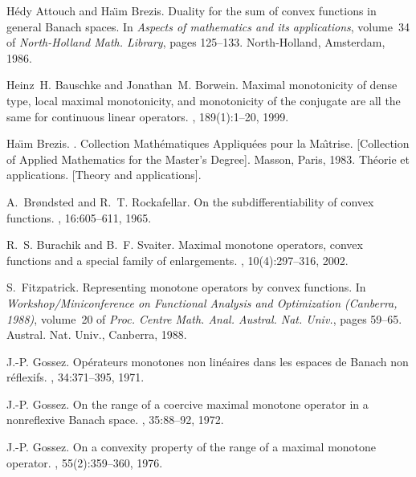 \documentclass[11pt]{article}
\begin{document}
\begin{thebibliography}{10}

H{\'e}dy Attouch and Ha{\"{\i}}m Brezis.
\newblock Duality for the sum of convex functions in general {B}anach spaces.
\newblock In {\em Aspects of mathematics and its applications}, volume~34 of
  {\em North-Holland Math. Library}, pages 125--133. North-Holland, Amsterdam,
  1986.

Heinz~H. Bauschke and Jonathan~M. Borwein.
\newblock Maximal monotonicity of dense type, local maximal monotonicity, and
  monotonicity of the conjugate are all the same for continuous linear
  operators.
, 189(1):1--20, 1999.

Ha{\"{\i}}m Brezis.
.
\newblock Collection Math\'ematiques Appliqu\'ees pour la Ma\^\i trise.
  [Collection of Applied Mathematics for the Master's Degree]. Masson, Paris,
  1983.
\newblock Th{\'e}orie et applications. [Theory and applications].

A.~Br{\o}ndsted and R.~T. Rockafellar.
\newblock On the subdifferentiability of convex functions.
, 16:605--611, 1965.

R.~S. Burachik and B.~F. Svaiter.
\newblock Maximal monotone operators, convex functions and a special family of
  enlargements.
, 10(4):297--316, 2002.

S.~Fitzpatrick.
\newblock Representing monotone operators by convex functions.
\newblock In {\em Workshop/Miniconference on Functional Analysis and
  Optimization (Canberra, 1988)}, volume~20 of {\em Proc. Centre Math. Anal.
  Austral. Nat. Univ.}, pages 59--65. Austral. Nat. Univ., Canberra, 1988.

J.-P. Gossez.
\newblock Op\'erateurs monotones non lin\'eaires dans les espaces de {B}anach
  non r\'eflexifs.
, 34:371--395, 1971.

J.-P. Gossez.
\newblock On the range of a coercive maximal monotone operator in a
  nonreflexive {B}anach space.
, 35:88--92, 1972.

J.-P. Gossez.
\newblock On a convexity property of the range of a maximal monotone operator.
, 55(2):359--360, 1976.


\end{thebibliography}
\end{document}
